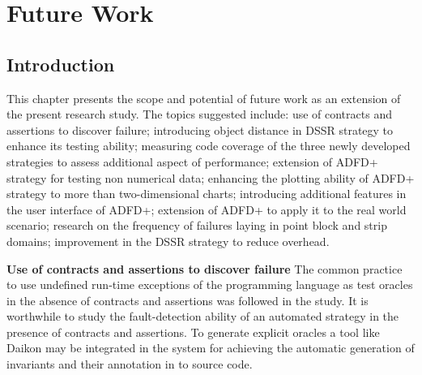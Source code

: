 
\chapter{Future Work}
\label{chap:futureWork}

\section{Introduction}\label{sec:intro8}
	
This chapter presents the scope and potential of future work as an extension of the present research study. The topics suggested include: use of contracts and assertions to discover failure; introducing object distance in DSSR strategy to enhance its testing ability; measuring code coverage of the three newly developed strategies to assess additional aspect of performance; extension of ADFD+ strategy for testing non numerical data; enhancing the plotting ability of ADFD+ strategy to more than two-dimensional charts; introducing additional features in the user interface of ADFD+; extension of ADFD+ to apply it to the real world scenario; research on the frequency of failures laying in point block and strip domains; improvement in the DSSR strategy to reduce overhead. 

	



\textbf{Use of contracts and assertions to discover failure}
The common practice to use undefined run-time exceptions of the programming language as test oracles in the absence of contracts and assertions was followed in the study. It is worthwhile to study the fault-detection ability of an automated strategy in the presence of contracts and assertions. To generate explicit oracles a tool like Daikon may be integrated in the system for achieving the automatic generation of invariants and their annotation in to source code.\\

